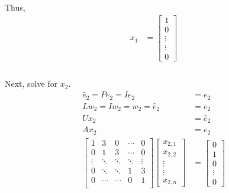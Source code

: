 \documentclass[a4paper]{article}
\begin{document}
Thus, 
\begin{equation*}
\begin{split}
    x_1 &= \begin{bmatrix}
   1 \\ 0 \\ \vdots\\ \vdots\\ 0
        \end{bmatrix}\\
\end{split}
\end{equation*}
\paragraph{}
Next, solve for $x_2$.
\begin{equation*}
\begin{split}
\hat{e}_2 = Pe_2 = Ie_2 &= e_2 \\
Lw_2 = Iw_2 = w_2 = \hat{e}_2 &= e_2 \\
Ux_2 &= \hat{e}_2\\
Ax_2 &= e_2 \\
\begin{bmatrix}
   1 & 3 & 0 & \cdots & 0 \\
   0 & 1 & 3 & \cdots & 0 \\ 
   \vdots & \ddots & \ddots & \ddots & \vdots\\
   0 & \ddots &\ddots & 1 & 3 \\
   0 & \cdots &\cdots & 0 & 1\\
\end{bmatrix}
\begin{bmatrix}
   x_{2,1} \\ x_{2,2} \\ \vdots\\ \vdots\\ x_{2,n}
\end{bmatrix}
&= \begin{bmatrix}
   0 \\ 1 \\ 0\\ \vdots\\ 0
\end{bmatrix}\\
\end{split}
\end{equation*}
\end{document}
